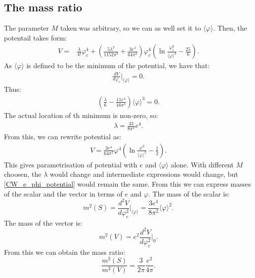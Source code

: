 \subsection{The mass ratio}
The parameter $M$ taken was arbitrary, so we can as well set it to $\langle\varphi\rangle$.
Then, the potentail takes form: 
\begin{align}
V = &\frac{\lambda}{4!}\varphi_c^4
+\left(\frac{5\lambda^2}{1152\pi^2}+\frac{3e^4}{64\pi^2}\right)\varphi_c^4
\left(\ln\frac{\varphi_c^2}{\langle\varphi\rangle^2}-\frac{25}{6}\right). 
\end{align} 
As $\langle\varphi\rangle$ is defined to be the minimum of the potential, we have that:
\begin{align}
\frac{dV}{d\varphi_c}\Big|_{\langle\varphi\rangle} = 0.
\end{align} 
Thus:
\begin{align}
\left(\frac{\lambda}{6}-\frac{11e^4}{16\pi^2}\right)\langle\varphi\rangle^3 = 0.
\end{align}
The actual location of th minimum is non-zero, so:
\begin{align}
\lambda = \frac{33}{8\pi^2}e^4.
\end{align}
From this, we can rewrite potential as:
\begin{align}\label{CW_e_phi_potential}
V = \frac{3e^4}{64\pi^2}\varphi^4\left(\ln{\frac{\varphi^2}{\langle\varphi\rangle^2}-
\frac{1}{2}}\right).
\end{align}
This gives parametrisation of potential with $e$ and $\langle\varphi\rangle$ alone. 
With different $M$ choosen, the $\lambda$ would change and intermediate expressions would change, 
but \ref{CW_e_phi_potential} would remain the same.
From this we can express masses of the scalar and the vector in terms of $e$ and $\varphi$.
The mass of the scalar is:
\begin{equation}
m^2(S) = \frac{d^2V}{d\varphi_c^2}\Big|_{\langle\varphi\rangle} = 
\frac{3e^4}{8\pi^2}\langle\varphi\rangle^2.
\end{equation}
The mass of the vector is:
\begin{equation}
m^2(V) = e^2\frac{d^2V}{d\varphi_c^2}\Big|_0.
\end{equation}
From this we can obtain the mass ratio:
\begin{equation}
\frac{m^2(S)}{m^2(V)} = \frac{3}{2\pi}\frac{e^2}{4\pi}.
\end{equation}
















